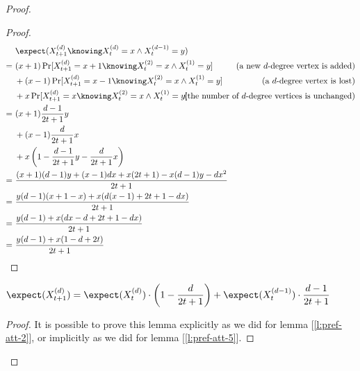 \begin{proof}
    \begin{proof}
        \begin{align*}
            &\ \expect(X_{t + 1}^{(d)} \knowing X_t^{(d)} = x \wedge X_t^{(d - 1)} = y)             & \\
            =&\  (x + 1) \Pr[X_{t + 1}^{(d)} = x + 1 \knowing X_t^{(2)} = x \wedge X_t^{(1)} = y]   & \text{(a new $d$-degree vertex is added)} \\
             &\; + (x - 1) \Pr[X_{t + 1}^{(d)} = x - 1 \knowing X_t^{(2)} = x \wedge X_t^{(1)} = y] & \text{(a $d$-degree vertex is lost)} \\
             &\; + x \Pr[X_{t + 1}^{(d)} = x \knowing X_t^{(2)} = x \wedge X_t^{(1)} = y]           & \mathllap{\text{(the number of $d$-degree vertices is unchanged)}} \\
            =&\ (x + 1) \frac{d - 1}{2t + 1} y                                                      & \\
             &\; + (x - 1) \frac{d}{2t + 1} x                                                       & \\
             &\; + x \left( 1 - \frac{d - 1}{2t + 1} y - \frac{d}{2t + 1} x \right)                 & \\
            =&\ \frac{(x + 1)(d - 1)y + (x - 1)dx + x(2t + 1) - x(d - 1)y - dx^2}{2t + 1}           & \\
            =&\ \frac{y(d - 1)(x + 1 - x) + x(d(x - 1) + 2t + 1 - dx)}{2t + 1}                      & \\
            =&\ \frac{y(d - 1) + x(dx  - d + 2t + 1 - dx)}{2t + 1}                                  & \\
            =&\ \frac{y(d - 1) + x(1 - d + 2t)}{2t + 1}                                             & \qedhere
        \end{align*}
    \end{proof}

    \begin{lemma}\label{l:pref-att-8}
        $\displaystyle \expect(X_{t + 1}^{(d)}) = \expect(X_t^{(d)}) \cdot \left( 1 - \frac{d}{2t + 1} \right) + \expect(X_t^{(d - 1)}) \cdot \frac{d - 1}{2t + 1}$
    \end{lemma}

    \begin{proof}
        It is possible to prove this lemma explicitly as we did for lemma [\ref{l:pref-att-2}], or implicitly as we did for lemma [\ref{l:pref-att-5}].
    \end{proof}


\end{proof}
